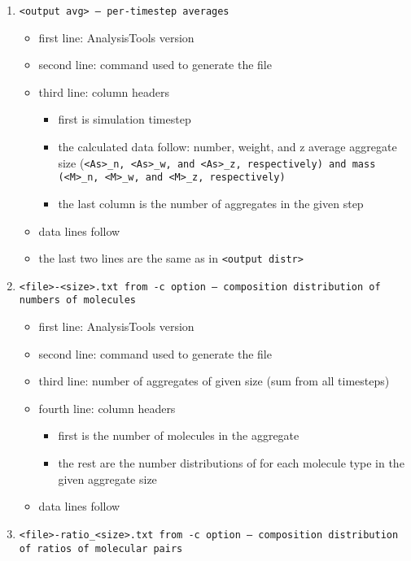 \begin{enumerate}[nosep,leftmargin=20pt]
\begin{itemize}[nosep,leftmargin=5pt]
    \end{itemize}
  \item \tt{<output avg>} -- per-timestep averages
    \begin{itemize}[nosep,leftmargin=5pt]
      \item first line: AnalysisTools version
      \item second line: command used to generate the file
      \item third line: column headers
      \begin{itemize}[nosep,leftmargin=10pt]
        \item first is simulation timestep
        \item the calculated data follow: number, weight, and z average
          aggregate size (\tt{<As>_n}, \tt{<As>_w}, and \tt{<As>_z},
          respectively) and mass (\tt{<M>_n}, \tt{<M>_w}, and \tt{<M>_z},
          respectively)
        \item the last column is the number of aggregates in the given step
      \end{itemize}
    \item data lines follow
    \item the last two lines are the same as in \tt{<output distr>}
  \end{itemize}
\item \tt{<file>-<size>.txt} from \tt{-c} option -- composition distribution of
  numbers of molecules
  \begin{itemize}[nosep,leftmargin=5pt]
    \item first line: AnalysisTools version
    \item second line: command used to generate the file
    \item third line: number of aggregates of given size (sum from all
      timesteps)
    \item fourth line: column headers
      \begin{itemize}[nosep,leftmargin=10pt]
        \item first is the number of molecules in the aggregate
        \item the rest are the number distributions of for each molecule type in
          the given aggregate size
      \end{itemize}
    \item data lines follow
  \end{itemize}
\item \tt{<file>-ratio_<size>.txt} from \tt{-c} option -- composition
  distribution of ratios of molecular pairs

\end{enumerate}
